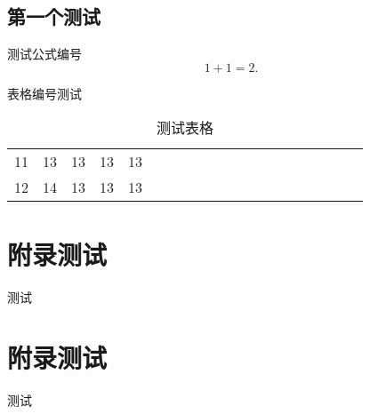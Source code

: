 \documentclass[forprint]{WHUBachelor}
\begin{document}
   \section{第一个测试}
   测试公式编号
   \begin{equation}
   1+1=2.
   \end{equation}
   
   表格编号测试
   
   \begin{table}[h]
     \centering
     \caption{测试表格}
     \begin{tabular}{*{20}c}
        \hline
        11 & 13  & 13  & 13  & 13 \\
        12 & 14  & 13  & 13  & 13 \\
        \hline
      \end{tabular}
   \end{table}
   
   
   \chapter{附录测试}
   
   测试
   
   \chapter{附录测试}
   
   测试
   
   \cleardoublepage
   
\end{document}
